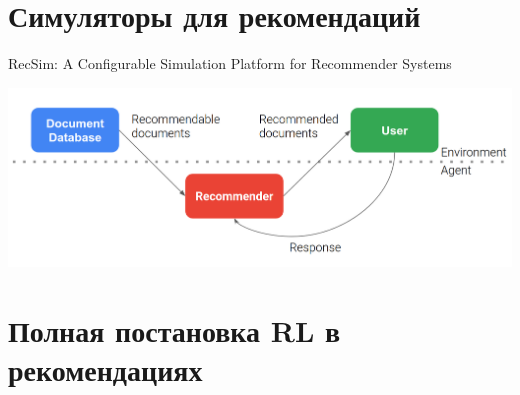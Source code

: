 \documentclass[11pt,aspectratio=169,handout]{beamer}
\begin{document}
\section{Симуляторы для рекомендаций}

\begin{frame}{RecSim: A Configurable Simulation Platform for Recommender Systems \cite{RECSIM}}

\begin{center}
\includegraphics[scale=0.2]{images/recsim.png}
\end{center}

\end{frame}

\section{Полная постановка RL в рекомендациях}
\end{document}
